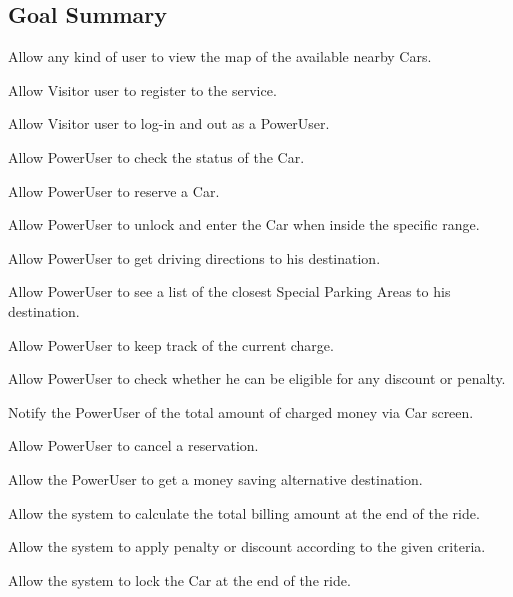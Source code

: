 \subsection{Goal Summary}
\begin{enumerate}[label={[}G\arabic*{]}]
\item Allow any kind of user to view the map of the available nearby Cars.
\item Allow Visitor user to register to the service.
\item Allow Visitor user to log-in and out as a PowerUser.
\item Allow PowerUser to check the status of the Car.
\item Allow PowerUser to reserve a Car.
\item Allow PowerUser to unlock and enter the Car when inside the specific range.
\item Allow PowerUser to get driving directions to his destination.
\item Allow PowerUser to see a list of the closest Special Parking Areas to his destination.
\item Allow PowerUser to keep track of the current charge. 
\item Allow PowerUser to check whether he can be eligible for any discount or penalty.
\item Notify the PowerUser of the total amount of charged money via Car screen.
\item Allow PowerUser to cancel a reservation.
\item Allow the PowerUser to get a money saving alternative destination.
\item Allow the system to calculate the total billing amount at the end of the ride.
\item Allow the system to apply penalty or discount according to the given criteria.
\item Allow the system to lock the Car at the end of the ride.
\end{enumerate}
